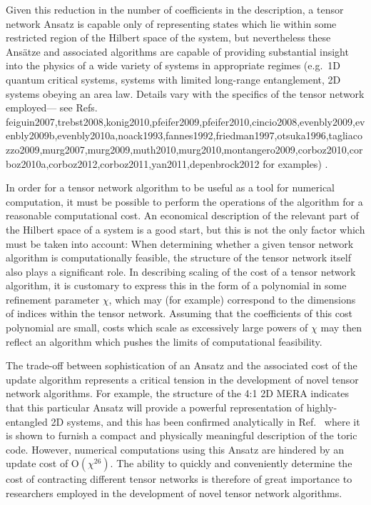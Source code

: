 \documentclass[aps,pre,reprint,superscriptaddress,amsfonts,amsmath,showpacs,nofootinbib,floatfix]{revtex4-1}
\newcommand{\mrm}[1]{\mathrm{#1}}
\newcommand{\rcite}[1]{Ref.~\onlinecite{#1}}
\newcommand{\OO}[1]{\mrm{O}(#1)}
\begin{document}
Given this reduction in the number of coefficients in the description, a tensor network Ansatz is capable only of representing states which lie within some restricted region of the Hilbert space of the system, but nevertheless these Ans\"atze and associated algorithms are capable of providing substantial insight into the physics of a wide variety of %
systems in appropriate regimes (e.g.~1D quantum critical systems, systems with limited long-range entanglement, 2D systems obeying an area law. Details vary with the specifics of the tensor network employed---%
see Refs.~\onlinecite
{feiguin2007,trebst2008,konig2010,pfeifer2009,pfeifer2010,cincio2008,evenbly2009,evenbly2009b,evenbly2010a,noack1993,fannes1992,friedman1997,otsuka1996,tagliacozzo2009,murg2007,murg2009,muth2010,murg2010,montangero2009,corboz2010,corboz2010a,corboz2012,corboz2011,yan2011,depenbrock2012} for examples)%
.

In order for a tensor network algorithm to be useful as a tool for numerical computation, it must be possible to perform the operations of the algorithm for a reasonable computational cost. An economical description of the relevant part of the Hilbert space of a system is a good start, but this is not the only factor which must be taken into account: When determining whether a given tensor network algorithm is computationally feasible, the structure of the tensor network itself also plays a significant role. In describing scaling of the cost of a tensor network algorithm, it is customary to express this in the form of a polynomial in some refinement parameter $\chi$, which may (for example) correspond to the dimensions of indices within the tensor network. Assuming that the coefficients of this cost polynomial are small, costs which scale as excessively large powers of $\chi$ may then reflect an algorithm which pushes the limits of computational feasibility.



The trade-off between sophistication of an Ansatz and the associated cost of the update algorithm represents a critical tension in the development of novel tensor network algorithms. For example, the structure of the 4:1 2D MERA \cite{cincio2008,evenbly2009} indicates that this particular Ansatz will provide a powerful representation of highly-entangled 2D systems, and this has been confirmed analytically in \rcite{aguado2008} where it is shown to furnish a compact and physically meaningful description of the toric code. However, numerical computations using this Ansatz are hindered by an update cost of $\OO{\chi^{26}}$. 
The ability to quickly and conveniently determine the cost of contracting different tensor networks is therefore of great importance to researchers employed in the development of novel tensor network algorithms.
\end{document}
